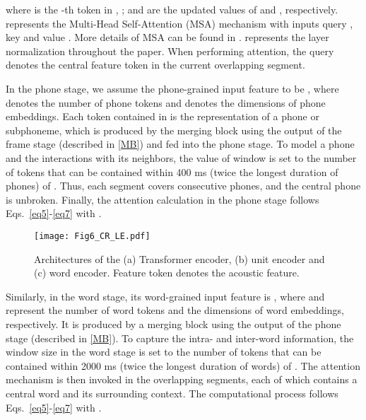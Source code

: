 \documentclass[lettersize,journal]{IEEEtran}
\begin{document}
where  is the -th token in , ;  and  are the updated values of  and , respectively.  represents the Multi-Head Self-Attention (MSA) mechanism with inputs query , key  and value . More details of MSA can be found in \cite{Transformer}.  represents the layer normalization \cite{LN} throughout the paper. When performing attention, the query  denotes the central feature token in the current overlapping segment. 

In the phone stage, we assume the phone-grained input feature to be , where  denotes the number of phone tokens and  denotes the dimensions of phone embeddings. Each token contained in  is the representation of a phone or subphoneme, which is produced by the merging block using the output of the frame stage (described in \ref{MB}) and fed into the phone stage. To model a phone and the interactions with its neighbors, the value of window  is set to the number of tokens that can be contained within 400 ms (twice the longest duration of phones) of . Thus, each segment covers consecutive phones, and the central phone is unbroken. Finally, the attention calculation in the phone stage follows Eqs.~\ref{eq5}-\ref{eq7} with .

\begin{figure}[t]
\centering
\texttt{[image: Fig6\_CR\_LE.pdf]}
\caption{Architectures of the (a) Transformer encoder, (b) unit encoder and (c) word encoder. Feature token denotes the acoustic feature.}
\label{fig_5}
\end{figure}

Similarly, in the word stage, its word-grained input feature is , where  and  represent the number of word tokens and the dimensions of word embeddings, respectively. It is produced by a merging block using the output of the phone stage (described in \ref{MB}). To capture the intra- and inter-word information, the window size  in the word stage is set to the number of tokens that can be contained within 2000 ms (twice the longest duration of words) of . The attention mechanism is then invoked in the overlapping segments, each of which contains a central word and its surrounding context. The computational process follows Eqs.~\ref{eq5}-\ref{eq7} with . 
\end{document}
